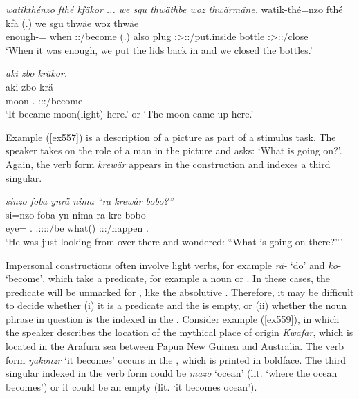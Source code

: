 \begin{exe}
	\ex \emph{watikthénzo fthé kfäkor ... we sgu thwäthbe woz thwärmäne.}
	\gll watik-thé=nzo fthé kfä (.) we sgu thwäe woz thwäe\\
	enough-\Adlzr={\Only} when \Stsg:\Sbj:\Iter/become (.) also plug \Fpl:\Sbj>\Stpl:\Obj:\Iter/put.inside bottle \Fpl:\Sbj>\Stpl:\Obj:\Iter/close\\
	\trans `When it was enough, we put the lids back in and we closed the bottles.'\\
	\label{ex737}
\end{exe}
\begin{exe}
	\ex \emph{aki zbo kräkor.}\\
	\gll aki zbo krä\\
	moon \Prox.{\All} \Stsg:\Sbj:\Irr:\Pfv/become\\
	\trans `It became moon(light) here.' or `The moon came up here.'
	\label{ex738}
\end{exe}

Example (\ref{ex557}) is a description of a picture as part of a stimulus task. The speaker takes on the role of a man in the picture and asks: `What is going on?'. Again, the verb form \emph{krewär} appears in the  construction and indexes a third singular.

\begin{exe}
	\ex \emph{sinzo foba ynrä nima ``ra krewär bobo?''}\\
	\gll si=nzo foba yn nima ra kre bobo\\
	eye={\Only} \Dist.{\Abl} \Tsg.\Masc:\Sbj:\Nonpast:\Ipfv:\Venit/be {\Quot} what(\Abs) \Stsg:\Sbj:\Irr:\Pfv/happen \Med.{\All}\\
	\trans `He was just looking from over there and wondered: ``What is going on there?'''
	\label{ex557}
\end{exe}

Impersonal constructions often involve light verbs, for example \emph{rä-} `do' and \emph{ko-} `become', which take a  predicate, for example a noun or . In these cases, the  predicate will be unmarked for , like the absolutive . Therefore, it may be difficult to decide whether (i) it is a  predicate and the  is empty, or (ii) whether the noun phrase in question is the  indexed in the . Consider example (\ref{ex559}), in which the speaker describes the location of the mythical place of origin \emph{Kwafar}, which is located in the Arafura sea between Papua New Guinea and Australia. The verb form \emph{ŋakonzr} `it becomes' occurs in the , which is printed in boldface. The third singular indexed in the verb form could be \emph{mazo} `ocean' (lit. `where the ocean becomes') or it could be an empty  (lit. `it becomes ocean').

